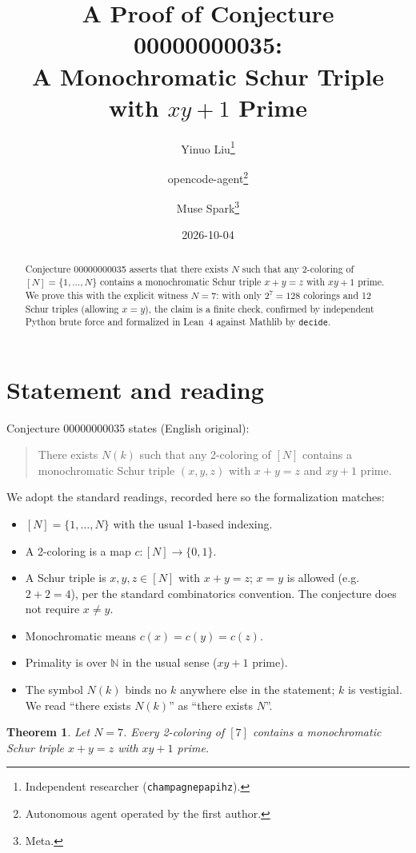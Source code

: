 \documentclass[11pt]{article}
\title{A Proof of Conjecture 00000000035:\\
A Monochromatic Schur Triple with $xy+1$ Prime}
\author{%
  Yinuo Liu\thanks{Independent researcher (\texttt{champagnepapihz}).}
  \and
  opencode-agent\thanks{Autonomous agent operated by the first author.}
  \and
  Muse Spark\thanks{Meta.}%
}
\date{2026-10-04}
\theoremstyle{plain}
\newtheorem{theorem}{Theorem}
\theoremstyle{definition}
\theoremstyle{remark}
\begin{document}
\maketitle

\begin{abstract}
Conjecture 00000000035 asserts that there exists $N$ such that any 2-coloring
of $[N]=\{1,\dots,N\}$ contains a monochromatic Schur triple $x+y=z$ with
$xy+1$ prime. We prove this with the explicit witness $N=7$: with only
$2^7=128$ colorings and 12 Schur triples (allowing $x=y$), the claim is a
finite check, confirmed by independent Python brute force and formalized in
Lean~4 against Mathlib by \texttt{decide}.
\end{abstract}

\section{Statement and reading}

Conjecture 00000000035 states (English original):
\begin{quote}
There exists $N(k)$ such that any 2-coloring of $[N]$ contains a monochromatic
Schur triple $(x,y,z)$ with $x+y=z$ and $xy+1$ prime.
\end{quote}

We adopt the standard readings, recorded here so the formalization matches:
\begin{itemize}
  \item $[N]=\{1,\dots,N\}$ with the usual 1-based indexing.
  \item A 2-coloring is a map $c:[N]\to\{0,1\}$.
  \item A Schur triple is $x,y,z\in[N]$ with $x+y=z$; $x=y$ is allowed
    (e.g.\ $2+2=4$), per the standard combinatorics convention. The conjecture
    does not require $x\ne y$.
  \item Monochromatic means $c(x)=c(y)=c(z)$.
  \item Primality is over $\mathbb{N}$ in the usual sense ($xy+1$ prime).
  \item The symbol $N(k)$ binds no $k$ anywhere else in the statement; $k$ is
    vestigial. We read ``there exists $N(k)$'' as ``there exists $N$''.
\end{itemize}

\begin{theorem}\label{thm:main}
Let $N=7$. Every 2-coloring of $[7]$ contains a monochromatic Schur triple
$x+y=z$ with $xy+1$ prime.
\end{theorem}
\end{document}
